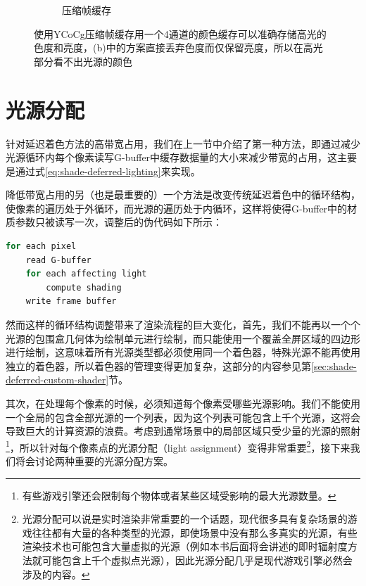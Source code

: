 \begin{figure}
\begin{subfigure}[b]{0.32\textwidth}
		\caption{压缩帧缓存}
	\end{subfigure}
\caption{使用YCoCg压缩帧缓存用一个4通道的颜色缓存可以准确存储高光的色度和亮度，(b)中的方案直接丢弃色度而仅保留亮度，所以在高光部分看不出光源的颜色}
\label{f:shade-deferred-lighting-1}
\end{figure}









\section{光源分配}\label{sec:shade-light-assignment}
针对延迟着色方法的高带宽占用，我们在上一节中介绍了第一种方法，即通过减少光源循环内每个像素读写G-buffer中缓存数据量的大小来减少带宽的占用，这主要是通过式\ref{eq:shade-deferred-lighting}来实现。

降低带宽占用的另（也是最重要的）一个方法是改变传统延迟着色中的循环结构，使像素的遍历处于外循环，而光源的遍历处于内循环，这样将使得G-buffer中的材质参数只被读写一次，调整后的伪代码如下所示：

\begin{lstlisting}[language=C++]
for each pixel 
	read G-buffer
	for each affecting light
		compute shading
	write frame buffer
\end{lstlisting}

然而这样的循环结构调整带来了渲染流程的巨大变化，首先，我们不能再以一个个光源的包围盒几何体为绘制单元进行绘制，而只能使用一个覆盖全屏区域的四边形进行绘制，这意味着所有光源类型都必须使用同一个着色器，特殊光源不能再使用独立的着色器，所以着色器的管理变得更加复杂，这部分的内容参见第\ref{sec:shade-deferred-custom-shader}节。

其次，在处理每个像素的时候，必须知道每个像素受哪些光源影响。我们不能使用一个全局的包含全部光源的一个列表，因为这个列表可能包含上千个光源，这将会导致巨大的计算资源的浪费。考虑到通常场景中的局部区域只受少量的光源的照射\footnote{有些游戏引擎还会限制每个物体或者某些区域受影响的最大光源数量。}，所以针对每个像素点的光源分配（light assignment）变得非常重要\footnote{光源分配可以说是实时渲染非常重要的一个话题，现代很多具有复杂场景的游戏往往都有大量的各种类型的光源，即使场景中没有那么多真实的光源，有些渲染技术也可能包含大量虚拟的光源（例如本书后面将会讲述的即时辐射度方法就可能包含上千个虚拟点光源），因此光源分配几乎是现代游戏引擎必然会涉及的内容。}，接下来我们将会讨论两种重要的光源分配方案。






